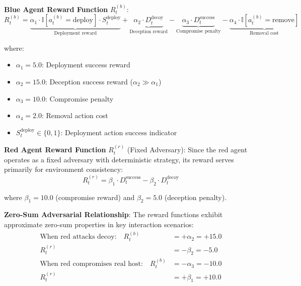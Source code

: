 \documentclass[12pt,twoside]{article}
\theoremstyle{definition}
\theoremstyle{plain}
\begin{document}
\textbf{Blue Agent Reward Function} $R_t^{(b)}$:
\begin{equation}
R_t^{(b)} = \underbrace{\alpha_1 \cdot \mathbb{I}[a_t^{(b)} = \text{deploy}] \cdot S_t^{\text{deploy}}}_{\text{Deployment reward}} + \underbrace{\alpha_2 \cdot D_t^{\text{decoy}}}_{\text{Deception reward}} - \underbrace{\alpha_3 \cdot D_t^{\text{success}}}_{\text{Compromise penalty}} - \underbrace{\alpha_4 \cdot \mathbb{I}[a_t^{(b)} = \text{remove}]}_{\text{Removal cost}}
\end{equation}

where:
\begin{itemize}
\item $\alpha_1 = 5.0$: Deployment success reward
\item $\alpha_2 = 15.0$: Deception success reward ($\alpha_2 \gg \alpha_1$)
\item $\alpha_3 = 10.0$: Compromise penalty  
\item $\alpha_4 = 2.0$: Removal action cost
\item $S_t^{\text{deploy}} \in \{0, 1\}$: Deployment action success indicator
\end{itemize}

\textbf{Red Agent Reward Function} $R_t^{(r)}$ (Fixed Adversary):
Since the red agent operates as a fixed adversary with deterministic strategy, its reward serves primarily for environment consistency:
\begin{equation}
R_t^{(r)} = \beta_1 \cdot D_t^{\text{success}} - \beta_2 \cdot D_t^{\text{decoy}}
\end{equation}

where $\beta_1 = 10.0$ (compromise reward) and $\beta_2 = 5.0$ (deception penalty).

\textbf{Zero-Sum Adversarial Relationship}:
The reward functions exhibit approximate zero-sum properties in key interaction scenarios:
\begin{align}
\text{When red attacks decoy:} \quad R_t^{(b)} &= +\alpha_2 = +15.0 \\
R_t^{(r)} &= -\beta_2 = -5.0 \\
\text{When red compromises real host:} \quad R_t^{(b)} &= -\alpha_3 = -10.0 \\
R_t^{(r)} &= +\beta_1 = +10.0
\end{align}
\end{document}
